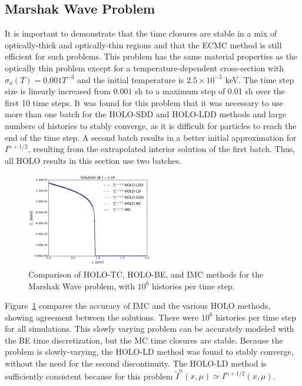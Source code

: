 \documentclass{anstrans}
\begin{document}
\subsection{Marshak Wave Problem}

It is important to demonstrate that the time closures are stable in a mix of optically-thick and
optically-thin regions and that the ECMC method is still efficient for such
problems.  This problem has the same material properties as the optically thin problem except for a
temperature-dependent cross-section with
$\sigma_a(T) = 0.001 T^{-3}$ and the initial temperature is $2.5\times10^{-5}$ keV.  The time step size is linearly increased from $0.001$ sh to a
maximum step of 0.01 sh over the first 10 time steps. 
It was found for this problem that it was
necessary to use more than one batch for the HOLO-SDD and HOLO-LDD methods and large numbers of
histories to stably converge, as it is difficult
for particles to reach the end of the time step.  A second batch results in a better initial approximation
for $I^{n+1/2}$, resulting from the extrapolated interior solution of the first batch.
Thus, all HOLO results in this section use two batches.
\begin{figure}[H]
    \centering
    \includegraphics[width=0.49\textwidth]{marshak_time_cont_compare.pdf}
    \caption{\label{fig:marshak_tc} Comparison of HOLO-TC, HOLO-BE, and IMC methods for
the Marshak Wave problem, with $10^6$ histories per time step.}
\end{figure}

Figure~\ref{fig:marshak_tc} compares the accuracy of IMC and the various HOLO methods, showing
agreement between the solutions. There were $10^6$ histories per time step for all
simulations. This slowly varying problem can be accurately modeled with the BE time discretization, but
the MC time closures are stable.  Because the problem is slowly-varying, the HOLO-LD method was found to stably
converge, without the need for the second discontinuity.  The HOLO-LD method is sufficiently
consistent because for this problem $\tilde I^n(x,\mu) \simeq I^{n+1/2}(x,\mu)$.
\end{document}
